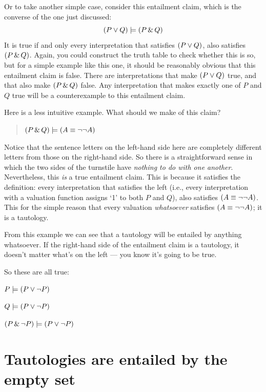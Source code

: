 Or to take another simple case, consider this entailment claim, which is the converse of the one just discussed:
$$(P \vee Q) \models (P \,\&\, Q)$$
It is true if and only every interpretation that satisfies $(P \vee Q)$, also satisfies $(P \,\&\, Q)$. Again, you could construct the truth table to check whether this is so, but for a simple example like this one, it should be reasonably obvious that this entailment claim is false. There are interpretations that make $(P \vee Q)$ true, and that also make $(P \,\&\, Q)$ false. Any interpretation that makes exactly one of $P$ and $Q$ true will be a counterexample to this entailment claim.

Here is a less intuitive example. What should we make of this claim?

\begin{quote}
$(P\,\&\, Q) \models (A\equiv\neg\neg A)$
\end{quote}

Notice that the sentence letters on the left-hand side here are completely different letters from those on the right-hand side. So there is a straightforward sense in which the two sides of the turnstile have \emph{nothing to do with one another}. Nevertheless, this \emph{is} a true entailment claim. This is because it satisfies the definition: every interpretation that satisfies the left (i.e., every interpretation with a valuation function assigns `1' to both $P$ and $Q$), also satisfies $(A\equiv\neg\neg A)$. This for the simple reason that every valuation \emph{whatsoever} satisfies $(A\equiv\neg\neg A)$; it is a tautology.

From this example we can see that a tautology will be entailed by anything whatsoever. If the right-hand side of the entailment claim is a tautology, it doesn't matter what's on the left --- you know it's going to be true.

So these are all true:

\begin{earg}
\item[] $P \models (P \vee \neg P)$
\item[] $Q \models (P \vee \neg P)$
\item[] $(P \,\&\, \neg P) \models (P \vee \neg P)$
\end{earg}

\section{Tautologies are entailed by the empty set}

